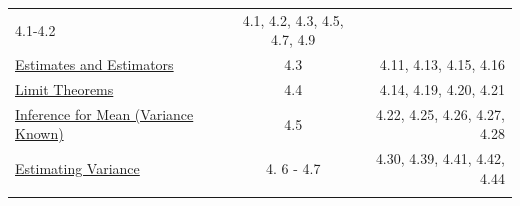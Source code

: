 \documentclass[]{book}
\theoremstyle{definition}
\theoremstyle{definition}
\theoremstyle{definition}
\theoremstyle{remark}
\begin{document}
\begin{longtable}[]{@{}lcr@{}}
\begin{minipage}[t]{0.33\columnwidth}
4.1-4.2\strut
\end{minipage} & \begin{minipage}[t]{0.29\columnwidth}\raggedleft\strut
4.1, 4.2, 4.3, 4.5, 4.7, 4.9\strut
\end{minipage}\tabularnewline
\begin{minipage}[t]{0.29\columnwidth}\raggedright\strut
\protect\hyperlink{L19}{Estimates and Estimators}\strut
\end{minipage} & \begin{minipage}[t]{0.33\columnwidth}\centering\strut
4.3\strut
\end{minipage} & \begin{minipage}[t]{0.29\columnwidth}\raggedleft\strut
4.11, 4.13, 4.15, 4.16\strut
\end{minipage}\tabularnewline
\begin{minipage}[t]{0.29\columnwidth}\raggedright\strut
\protect\hyperlink{L20}{Limit Theorems}\strut
\end{minipage} & \begin{minipage}[t]{0.33\columnwidth}\centering\strut
4.4\strut
\end{minipage} & \begin{minipage}[t]{0.29\columnwidth}\raggedleft\strut
4.14, 4.19, 4.20, 4.21\strut
\end{minipage}\tabularnewline
\begin{minipage}[t]{0.29\columnwidth}\raggedright\strut
\protect\hyperlink{L21}{Inference for Mean (Variance Known)}\strut
\end{minipage} & \begin{minipage}[t]{0.33\columnwidth}\centering\strut
4.5\strut
\end{minipage} & \begin{minipage}[t]{0.29\columnwidth}\raggedleft\strut
4.22, 4.25, 4.26, 4.27, 4.28\strut
\end{minipage}\tabularnewline
\begin{minipage}[t]{0.29\columnwidth}\raggedright\strut
\protect\hyperlink{L22}{Estimating Variance}\strut
\end{minipage} & \begin{minipage}[t]{0.33\columnwidth}\centering\strut
4. 6 - 4.7\strut
\end{minipage} & \begin{minipage}[t]{0.29\columnwidth}\raggedleft\strut
4.30, 4.39, 4.41, 4.42, 4.44\strut
\end{minipage}\tabularnewline
\begin{minipage}[t]{0.29\columnwidth}\raggedright\strut

\end{minipage}
\end{longtable}
\end{document}
